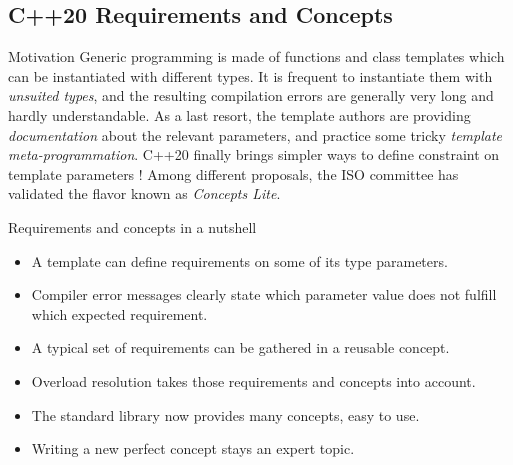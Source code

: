 \subsection[tmpl]{C++20 Requirements and Concepts}

\begin{frame}[fragile]
  \begin{block}{Motivation}
    Generic programming is made of functions and class templates
    which can be instantiated with different types. It is frequent
    to instantiate them with {\em unsuited types}, and the resulting
    compilation errors are generally very long and hardly understandable.
    As a last resort, the template authors are providing {\em documentation}
    about the relevant parameters, and practice some tricky
    {\em template meta-programmation}. C++20 finally brings simpler ways to
    define constraint on template parameters ! Among different proposals,
    the ISO committee has validated the flavor known as {\em Concepts Lite}.
  \end{block}
\end{frame}

\begin{frame}[fragile]
  \begin{block}{Requirements and concepts in a nutshell}
    \begin{itemize}
    \item A template can define requirements on some of its type parameters.
    \item Compiler error messages clearly state which parameter value does not fulfill which expected requirement.
    \item A typical set of requirements can be gathered in a reusable concept.
    \item Overload resolution takes those requirements and concepts into account.
    \item The standard library now provides many concepts, easy to use.
    \item Writing a new perfect concept stays an expert topic.
    \end{itemize}
  \end{block}
\end{frame}

